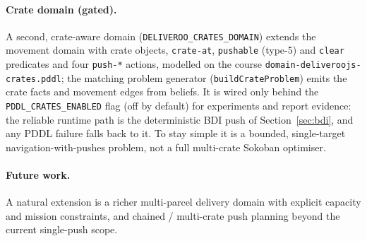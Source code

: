\paragraph{Crate domain (gated).} A second, crate-aware domain
(\texttt{DELIVEROO\_CRATES\_DOMAIN}) extends the movement domain with crate
objects, \texttt{crate-at}, \texttt{pushable} (type-5) and \texttt{clear}
predicates and four \texttt{push-*} actions, modelled on the course
\texttt{domain-deliveroojs-crates.pddl}; the matching problem generator
(\texttt{buildCrateProblem}) emits the crate facts and movement edges from
beliefs. It is wired only behind the \texttt{PDDL\_CRATES\_ENABLED} flag (off by
default) for experiments and report evidence: the reliable runtime path is the
deterministic BDI push of Section~\ref{sec:bdi}, and any PDDL failure falls back
to it. To stay simple it is a bounded, single-target navigation-with-pushes
problem, not a full multi-crate Sokoban optimiser.

\paragraph{Future work.} A natural extension is a richer multi-parcel delivery
domain with explicit capacity and mission constraints, and chained / multi-crate
push planning beyond the current single-push scope.
